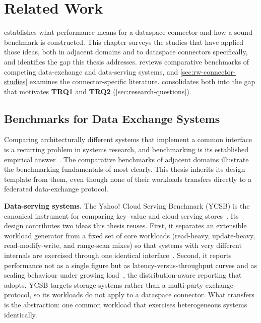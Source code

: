 \chapter{Related Work}\label{chap:related-work}

 establishes what performance means for a dataspace connector and how a sound benchmark is constructed. This chapter surveys the studies that have applied those ideas, both in adjacent domains and to dataspace connectors specifically, and identifies the gap this thesis addresses.  reviews comparative benchmarks of competing data-exchange and data-serving systems, and \cref{sec:rw-connector-studies} examines the connector-specific literature.  consolidates both into the gap that motivates \textbf{TRQ1} and \textbf{TRQ2} (\cref{sec:research-questions}).


\section{Benchmarks for Data Exchange Systems}\label{sec:rw-data-exchange}

Comparing architecturally different systems that implement a common interface is a recurring problem in systems research, and benchmarking is its established empirical answer~\citep{hasselbring2021benchmarking}. The comparative benchmarks of adjacent domains illustrate the benchmarking fundamentals of  most clearly. This thesis inherits its design template from them, even though none of their workloads transfers directly to a federated data-exchange protocol.

\textbf{Data-serving systems.} The Yahoo! Cloud Serving Benchmark (YCSB) is the canonical instrument for comparing key--value and cloud-serving stores~\citep{cooper2010ycsb}. Its design contributes two ideas this thesis reuses. First, it separates an extensible workload generator from a fixed set of core workloads (read-heavy, update-heavy, read-modify-write, and range-scan mixes) so that systems with very different internals are exercised through one identical interface~\citep{cooper2010ycsb}. Second, it reports performance not as a single figure but as latency-versus-throughput curves and as scaling behaviour under growing load~\citep{cooper2010ycsb}, the distribution-aware reporting that  adopts. YCSB targets storage systems rather than a multi-party exchange protocol, so its workloads do not apply to a dataspace connector. What transfers is the abstraction: one common workload that exercises heterogeneous systems identically.

